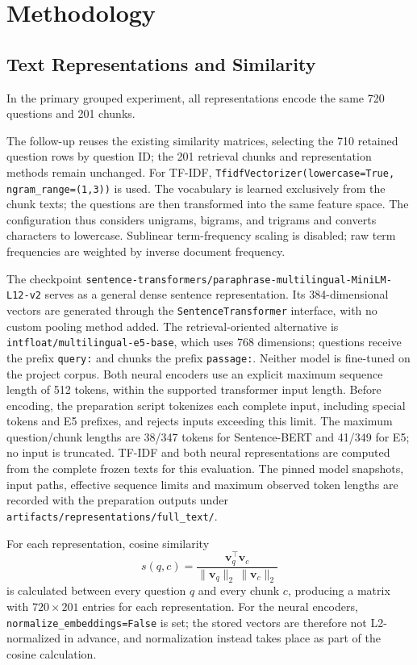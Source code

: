 \documentclass[11pt]{article}
\begin{document}
\section{Methodology}

\subsection{Text Representations and Similarity}

In the primary grouped experiment, all representations encode the same 720 questions and 201 chunks.

The follow-up reuses the existing similarity matrices, selecting the 710 retained question rows by question ID; the 201 retrieval chunks and representation methods remain unchanged. For TF-IDF, \texttt{TfidfVectorizer(lowercase=True, ngram\_range=(1,3))} is used. The vocabulary is learned exclusively from the chunk texts; the questions are then transformed into the same feature space. The configuration thus considers unigrams, bigrams, and trigrams and converts characters to lowercase. Sublinear term-frequency scaling is disabled; raw term frequencies are weighted by inverse document frequency.

The checkpoint \nolinkurl{sentence-transformers/paraphrase-multilingual-MiniLM-L12-v2} serves as a general dense sentence representation. Its 384-dimensional vectors are generated through the \texttt{SentenceTransformer} interface, with no custom pooling method added. The retrieval-oriented alternative is \texttt{intfloat/multilingual-e5-base}, which uses 768 dimensions; questions receive the prefix \texttt{query:} and chunks the prefix \texttt{passage:}. Neither model is fine-tuned on the project corpus. Both neural encoders use an explicit maximum sequence length of 512 tokens, within the supported transformer input length. Before encoding, the preparation script tokenizes each complete input, including special tokens and E5 prefixes, and rejects inputs exceeding this limit. The maximum question/chunk lengths are 38/347 tokens for Sentence-BERT and 41/349 for E5; no input is truncated. TF-IDF and both neural representations are computed from the complete frozen texts for this evaluation. The pinned model snapshots, input paths, effective sequence limits and maximum observed token lengths are recorded with the preparation outputs under \nolinkurl{artifacts/representations/full_text/}.

For each representation, cosine similarity
\begin{equation}
s(q,c)=\frac{\mathbf{v}_q^\top\mathbf{v}_c}
{\lVert\mathbf{v}_q\rVert_2\,\lVert\mathbf{v}_c\rVert_2}
\end{equation}
is calculated between every question $q$ and every chunk $c$, producing a matrix with $720\times201$ entries for each representation. For the neural encoders, \texttt{normalize\_embeddings=False} is set; the stored vectors are therefore not L2-normalized in advance, and normalization instead takes place as part of the cosine calculation.
\end{document}
